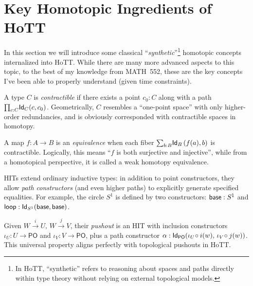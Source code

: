 \section{Key Homotopic Ingredients of HoTT}\label{sec:components}

In this section we will introduce some classical ``\emph{synthetic}''\footnote{In HoTT, ``synthetic'' refers to reasoning about spaces and paths directly within type theory without relying on external topological models.} homotopic concepts internalized into HoTT.
While there are many more advanced aspects to this topic, to the best of my knowledge from MATH~552, these are the key concepts I've been able to properly understand (given time constraints).

\begin{definition}\label{def:contract}
  A type \(C\) is \emph{contractible} if there exists a point \(c_0:C\) along with a path
  \(\textstyle\mathbf{\prod}_{c:C}\textsf{Id}_C(c,c_0)\). Geometrically, \(C\) resembles a ``one-point space'' with only higher-order redundancies, and is obviously corresponded with contractible spaces in homotopy.
\end{definition}

\begin{definition}[Equivalence]\label{def:equiv}
  A map \(f:A\to B\) is an \emph{equivalence} when each fiber
  \(\textstyle\mathbf{\sum}_{b:B}\textsf{Id}_B\left\lparen f(a),b \right\rparen\) is contractible. Logically, this means
  ``\(f\) is both surjective and injective'',  while from a homotopical perspective, it is called a weak homotopy equivalence.
\end{definition}

\begin{definition}\label{def:hit}
  HITs extend ordinary inductive types: in addition to point constructors, they allow \emph{path constructors} (and even higher paths)
  to explicitly generate specified equalities. For example, the circle
  \(S^1\) is defined by two constructors:
  \(\textsf{base}:S^1\) and \(\textsf{loop}:\textsf{Id}_{S^1}(\textsf{base},\textsf{base})\).
\end{definition}

\begin{definition}[Pushout]\label{def:pushout}
  Given \(W\xrightarrow{i}U,\,W\xrightarrow{j}V\), their \emph{pushout} is an HIT
  with inclusion constructors \( \iota_U:U\to\mathsf{PO}\) and \(\iota_V:V\to\mathsf{PO}\),
  plus a path constructor
  \( \alpha:\textsf{Id}_{\mathsf{PO}}\!\left\lparen \iota_U\!\circ i(w),\,\iota_V\!\circ j(w) \right\rparen\).
  This universal property aligns perfectly with topological pushouts in HoTT.
\end{definition}

